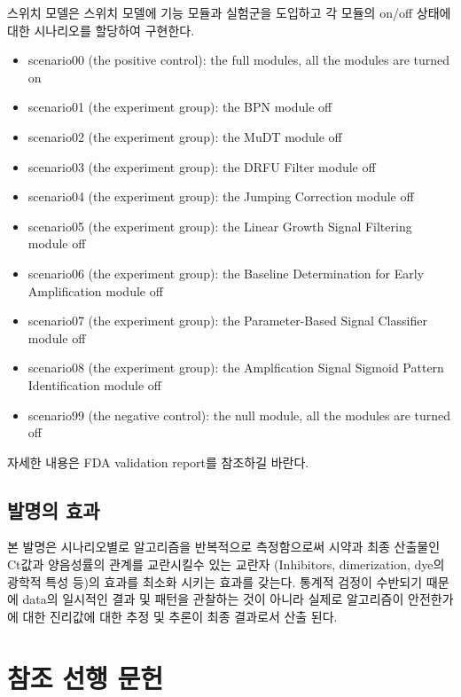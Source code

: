 \documentclass[
  letterpaper,
  DIV=11,
  numbers=noendperiod]{scrartcl}
\providecommand{\tightlist}{%
  \setlength{\itemsep}{0pt}\setlength{\parskip}{0pt}}\usepackage{longtable,booktabs,array}
\begin{document}
스위치 모델은 스위치 모델에 기능 모듈과 실험군을 도입하고 각 모듈의
on/off 상태에 대한 시나리오를 할당하여 구현한다.

\begin{itemize}
\tightlist
\item
  scenario00 (the positive control): the full modules, all the modules
  are turned on
\item
  scenario01 (the experiment group): the BPN module off
\item
  scenario02 (the experiment group): the MuDT module off
\item
  scenario03 (the experiment group): the DRFU Filter module off
\item
  scenario04 (the experiment group): the Jumping Correction module off
\item
  scenario05 (the experiment group): the Linear Growth Signal Filtering
  module off
\item
  scenario06 (the experiment group): the Baseline Determination for
  Early Amplification module off
\item
  scenario07 (the experiment group): the Parameter-Based Signal
  Classifier module off
\item
  scenario08 (the experiment group): the Amplfication Signal Sigmoid
  Pattern Identification module off
\item
  scenario99 (the negative control): the null module, all the modules
  are turned off
\end{itemize}

자세한 내용은 FDA validation report를 참조하길 바란다.

\hypertarget{uxbc1cuxba85uxc758-uxd6a8uxacfc}{%
\subsection{발명의 효과}\label{uxbc1cuxba85uxc758-uxd6a8uxacfc}}

본 발명은 시나리오별로 알고리즘을 반복적으로 측정함으로써 시약과 최종
산출물인 Ct값과 양음성률의 관계를 교란시킬수 있는 교란자 (Inhibitors,
dimerization, dye의 광학적 특성 등)의 효과를 최소화 시키는 효과를
갖는다. 통계적 검정이 수반되기 때문에 data의 일시적인 결과 및 패턴을
관찰하는 것이 아니라 실제로 알고리즘이 안전한가에 대한 진리값에 대한
추정 및 추론이 최종 결과로서 산출 된다.

\hypertarget{uxcc38uxc870-uxc120uxd589-uxbb38uxd5cc}{%
\section{참조 선행 문헌}\label{uxcc38uxc870-uxc120uxd589-uxbb38uxd5cc}}
\end{document}
